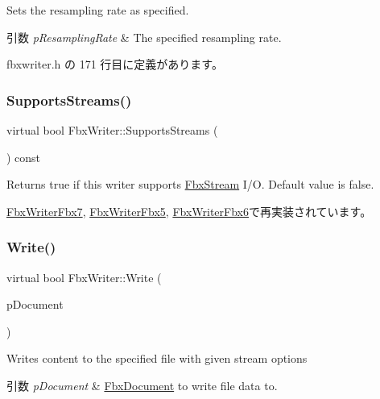 Sets the resampling rate as specified. 
\begin{DoxyParams}{引数}
{\em p\+Resampling\+Rate} & The specified resampling rate. \\
\hline
\end{DoxyParams}


 fbxwriter.\+h の 171 行目に定義があります。

\mbox{\label{class_fbx_writer_aa79a285227d113ee6d64aee6a84986cd}} 
\subsubsection{\texorpdfstring{Supports\+Streams()}{SupportsStreams()}}
{\footnotesize\ttfamily virtual bool Fbx\+Writer\+::\+Supports\+Streams (\begin{DoxyParamCaption}{ }\end{DoxyParamCaption}) const\hspace{0.3cm}{\ttfamily [virtual]}}

Returns true if this writer supports \hyperlink{class_fbx_stream}{Fbx\+Stream} I/O. Default value is false. 

\hyperlink{class_fbx_writer_fbx7_a1db3d07967773f3b1af23d15757c281a}{Fbx\+Writer\+Fbx7}, \hyperlink{class_fbx_writer_fbx5_a6e6683ad630d545bd0251f7bf8e114d9}{Fbx\+Writer\+Fbx5}, \hyperlink{class_fbx_writer_fbx6_a74bc2a2a859a59118567ac2d0a471ef7}{Fbx\+Writer\+Fbx6}で再実装されています。

\mbox{\label{class_fbx_writer_aa8c0277611da0fdb0b9a184c55c30c2c}} 
\subsubsection{\texorpdfstring{Write()}{Write()}}
{\footnotesize\ttfamily virtual bool Fbx\+Writer\+::\+Write (\begin{DoxyParamCaption}\item[{\hyperlink{class_fbx_document}{Fbx\+Document} $\ast$}]{p\+Document }\end{DoxyParamCaption})\hspace{0.3cm}{\ttfamily [pure virtual]}}

Writes content to the specified file with given stream options 
\begin{DoxyParams}{引数}
{\em p\+Document} & \hyperlink{class_fbx_document}{Fbx\+Document} to write file data to. \\
\hline
\end{DoxyParams}


